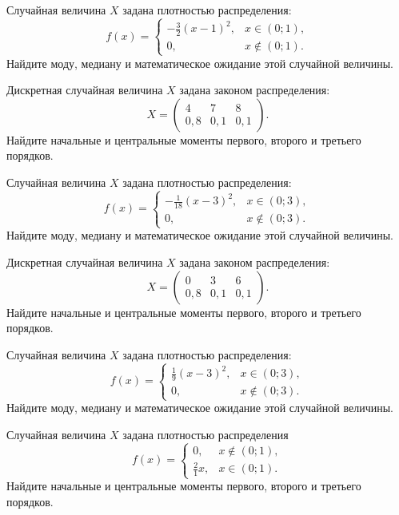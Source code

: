 \vfill

\newpage\setcounter{zad}{0}

\z Случайная величина $X$ задана плотностью распределения: $$f(x) = \begin{cases} -\frac{3}{2}(x-1)^2, & x \in (0; 1), \\ 0, & x \not\in (0; 1). \end{cases}$$ Найдите моду, медиану и математическое ожидание этой случайной величины.


\vfill

\z Дискретная случайная величина $X$ задана законом распределения: $$ X = \left(\begin{array}{rrr}4 & 7 & 8\\0{,}8 & 0{,}1 & 0{,}1\end{array}\right).$$ Найдите начальные и центральные моменты первого, второго и третьего порядков.
 

\vfill

\newpage\setcounter{zad}{0}

\z Случайная величина $X$ задана плотностью распределения: $$f(x) = \begin{cases} -\frac{1}{18}(x-3)^2, & x \in (0; 3), \\ 0, & x \not\in (0; 3). \end{cases}$$ Найдите моду, медиану и математическое ожидание этой случайной величины.


\vfill

\z Дискретная случайная величина $X$ задана законом распределения: $$ X = \left(\begin{array}{rrr}0 & 3 & 6\\0{,}8 & 0{,}1 & 0{,}1\end{array}\right).$$ Найдите начальные и центральные моменты первого, второго и третьего порядков.
 

\vfill

\newpage\setcounter{zad}{0}

\z Случайная величина $X$ задана плотностью распределения: $$f(x) = \begin{cases} \frac{1}{9}(x-3)^2, & x \in (0; 3), \\ 0, & x \not\in (0; 3). \end{cases}$$ Найдите моду, медиану и математическое ожидание этой случайной величины.


\vfill

\z Случайная величина $X$ задана плотностью распределения $$f(x) = \begin{cases}0, & x\not\in(0; 1), \\ \frac{2}{1}x, & x\in(0; 1).\end{cases}$$ Найдите начальные и центральные моменты первого, второго и третьего порядков.
 

